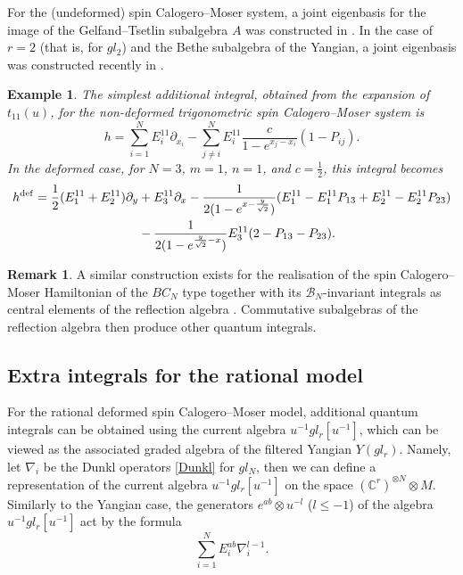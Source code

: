 \documentclass[12pt]{amsart}
\numberwithin{equation}{section}
\newtheorem{example}[theorem]{Example}
\theoremstyle{definition}
\newtheorem{remark}[theorem]{Remark}
\begin{document}
For the (undeformed) spin Calogero--Moser system, a joint eigenbasis for the image of the Gelfand--Tsetlin subalgebra $A$ was constructed in \cite{TakemuraUglov}. In the case of $r=2$ (that is, for $gl_2$) and the Bethe subalgebra of the Yangian, a joint eigenbasis was constructed recently in \cite{Ferrando}. 

\begin{example}
     The simplest additional integral, obtained from the 
     expansion of $t_{11}(u)$,  for the non-deformed trigonometric spin 
     Calogero--Moser system is
    \begin{equation*}
        h = \sum\limits_{i = 1}^N E^{11}_i \partial_{x_i} - 
        \sum\limits_{j \neq i}^N E^{11}_i \frac{c}{1 - e^{x_j - x_i}}(1 - P_{ij}).
    \end{equation*}
    In the deformed case, for $N = 3$, $m = 1$, $n = 1$, and 
    $c = \frac{1}{2}$, this integral becomes
    \begin{align*}
        h^{\rm def}  = \frac{1}{2}(E^{11}_1 + E^{11}_2) \partial_y &+ E^{11}_3
        \partial_{x} -  \frac{1}{2(1 - e^{x - \frac{y}{\sqrt{2}}})} 
        (E^{11}_1 - E^{11}_1 P_{13} + E^{11}_2 - E_2^{11} P_{23})  \\ 
        &- \frac{1}{2(1 - e^{\frac{y}{\sqrt{2}} - x})} E^{11}_3 
        (2 - P_{13} - P_{23}).
    \end{align*}
\end{example}

\begin{remark}
    A similar construction exists for the realisation of the spin Calogero--Moser Hamiltonian of the $BC_N$ type together with its $\mathcal{B}_N$-invariant integrals as central elements of the reflection algebra \cite{CC}. Commutative subalgebras of the reflection algebra then produce other quantum integrals.
\end{remark}



\subsection{Extra integrals for the rational model}
For the rational deformed spin Calogero--Moser model, additional quantum integrals 
can be obtained using the current algebra $u^{-1} gl_r [u^{-1}]$, which can be 
viewed as the associated graded algebra of the filtered Yangian $Y(gl_r)$. 
Namely, let $\nabla_i$ be the Dunkl operators \eqref{Dunkl} for $gl_N$, 
then we can define a representation of the current algebra $u^{-1} gl_r [u^{-1}]$ 
on the space  $(\mathbb{C}^r)^{\otimes N} \otimes M$.
Similarly to the Yangian case, the generators $e^{ab} \otimes u^{-l}$ ($l \leq -1$) 
of the algebra $u^{-1} gl_r [u^{-1}]$ act by the formula
\begin{equation*}
\label{current}
    \sum\limits_{i = 1}^N E^{ab}_i \nabla_i^{l - 1}.
\end{equation*}
\end{document}
